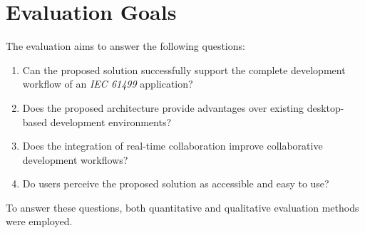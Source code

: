 


\section{Evaluation Goals}

The evaluation aims to answer the following questions:

\begin{enumerate}
\item Can the proposed solution successfully support the complete development workflow of an \textit{IEC 61499} application?
\item Does the proposed architecture provide advantages over existing desktop-based development environments?
\item Does the integration of real-time collaboration improve collaborative development workflows?
\item Do users perceive the proposed solution as accessible and easy to use?
\end{enumerate}

To answer these questions, both quantitative and qualitative evaluation methods were employed.


